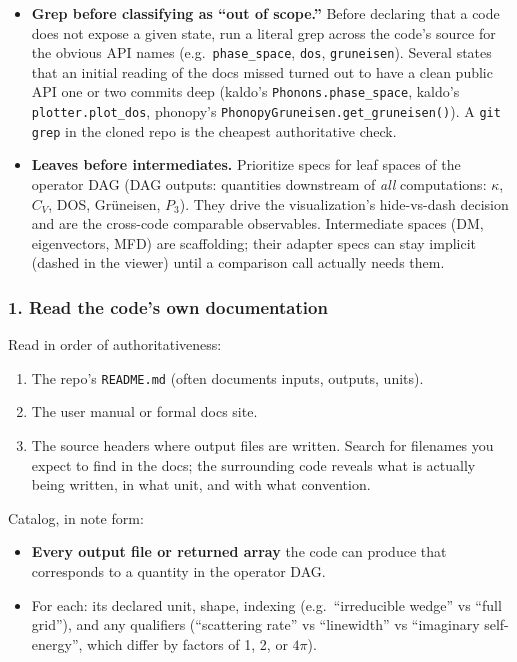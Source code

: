\documentclass[11pt,a4paper]{article}
\begin{document}
\begin{itemize}[leftmargin=2em]
  \item \textbf{Grep before classifying as ``out of scope.''} Before declaring
        that a code does not expose a given state, run a literal grep across the
        code's source for the obvious API names (e.g.\ \texttt{phase\_space},
        \texttt{dos}, \texttt{gruneisen}). Several states that an initial reading
        of the docs missed turned out to have a clean public API one or two
        commits deep (kaldo's \texttt{Phonons.phase\_space}, kaldo's
        \texttt{plotter.plot\_dos}, phonopy's
        \texttt{PhonopyGruneisen.get\_gruneisen()}). A \texttt{git grep} in the
        cloned repo is the cheapest authoritative check.
  \item \textbf{Leaves before intermediates.} Prioritize specs for leaf spaces of
        the operator DAG (DAG outputs: quantities downstream of \emph{all}
        computations: $\kappa$, $C_V$, DOS, Grüneisen, $P_3$). They drive the
        visualization's hide-vs-dash decision and are the cross-code comparable
        observables. Intermediate spaces (DM, eigenvectors, MFD) are scaffolding;
        their adapter specs can stay implicit (dashed in the viewer) until a
        comparison call actually needs them.
\end{itemize}

\subsubsection*{1. Read the code's own documentation}

Read in order of authoritativeness:
\begin{enumerate}[leftmargin=2em]
  \item The repo's \texttt{README.md} (often documents inputs, outputs, units).
  \item The user manual or formal docs site.
  \item The source headers where output files are written. Search for filenames
        you expect to find in the docs; the surrounding code reveals what is
        actually being written, in what unit, and with what convention.
\end{enumerate}
Catalog, in note form:
\begin{itemize}[leftmargin=2em]
  \item \textbf{Every output file or returned array} the code can produce that
        corresponds to a quantity in the operator DAG.
  \item For each: its declared unit, shape, indexing (e.g.\ ``irreducible wedge''
        vs ``full grid''), and any qualifiers (``scattering rate'' vs
        ``linewidth'' vs ``imaginary self-energy'', which differ by factors of 1,
        2, or $4\pi$).
\end{itemize}
\end{document}
